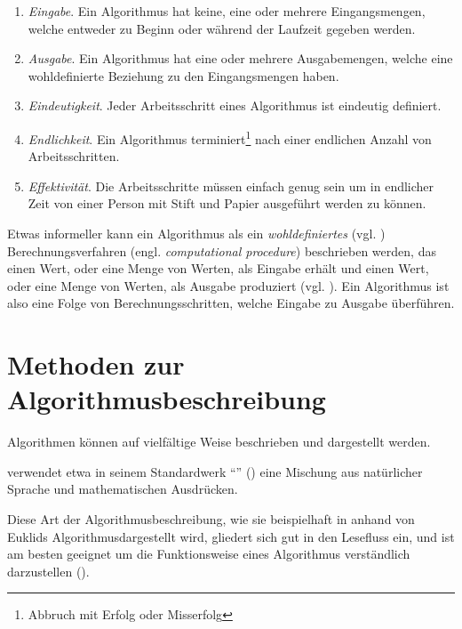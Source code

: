 \begin{enumerate}
    \item \emph{Eingabe}. Ein Algorithmus hat keine, eine oder mehrere Eingangsmengen, welche entweder zu Beginn oder während der Laufzeit gegeben werden.

    \item \emph{Ausgabe}. Ein Algorithmus hat eine oder mehrere Ausgabemengen, welche eine wohldefinierte Beziehung zu den Eingangsmengen haben.
    
    \item \emph{Eindeutigkeit}. Jeder Arbeitsschritt eines Algorithmus ist eindeutig definiert.

    \item \emph{Endlichkeit}. Ein Algorithmus terminiert\footnote{Abbruch mit Erfolg oder Misserfolg} nach einer endlichen Anzahl von Arbeitsschritten.

    \item \emph{Effektivität}. Die Arbeitsschritte müssen einfach genug sein um in endlicher Zeit von einer Person mit Stift und Papier ausgeführt werden zu können. 
\end{enumerate}

Etwas informeller kann ein Algorithmus als ein \emph{wohldefiniertes} (vgl. \cite[16]{alu2009}) Berechnungsverfahren (engl. \emph{computational procedure}) beschrieben werden, das einen Wert, oder eine Menge von Werten, als Eingabe erhält und einen Wert, oder eine Menge von Werten, als Ausgabe produziert (vgl. \cite[5]{clrs2001}). Ein Algorithmus ist also eine Folge von Berechnungsschritten, welche Eingabe zu Ausgabe überführen.

\section{Methoden zur Algorithmusbeschreibung}
\label{sec:algorithm-specification-overview}

Algorithmen können auf vielfältige Weise beschrieben und dargestellt werden.

\citeauthor{taocp1} verwendet etwa in seinem Standardwerk \enquote{} (\cite{taocp1}) eine Mischung aus natürlicher Sprache und mathematischen Ausdrücken. 



Diese Art der Algorithmusbeschreibung, wie sie beispielhaft in  anhand von Euklids Algorithmus\footnotemark dargestellt wird, gliedert sich gut in den Lesefluss ein, und ist am besten geeignet um die Funktionsweise eines Algorithmus verständlich darzustellen (\cite[147]{zob2015}).

